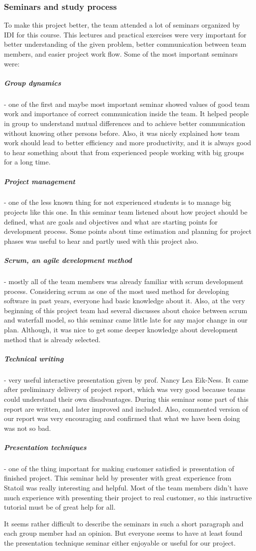 	\subsubsection{Seminars and study process}
	To make this project better,  the team attended a lot of seminars organized by IDI for this course. This lectures and practical exercises were very important for better understanding of the given problem, better communication between team members, and easier project work flow. Some of the most important seminars were:
	
	\subparagraph{Group dynamics} - one of the first and maybe most important seminar showed values of good team work and importance of correct communication inside the team. It helped people in group to understand mutual differences and to achieve better communication without knowing other persons before. Also, it was nicely explained how team work should lead to better efficiency and more productivity, and it is always good to hear something about that from experienced people working with big groups for a long time.
	\subparagraph{Project management} - one of the less known thing for not experienced students is to manage big projects like this one. In this seminar team listened about how project should be defined, what are goals and objectives and what are starting points for development process. Some points about time estimation and planning for project phases was useful to hear and partly used with this project also.
	\subparagraph{Scrum, an agile development method} - mostly all of the team members was already familiar with scrum development process. Considering scrum as one of the most used method for developing software in past years, everyone had basic knowledge about it. Also, at the very beginning of this project team had several discusses about choice between scrum and waterfall model, so this seminar came little late for any major change in our plan. Although, it was nice to get some deeper knowledge about development method that is already selected.
	\subparagraph{Technical writing} - very useful interactive presentation given by prof. Nancy Lea Eik-Ness. It came after preliminary delivery of project report, which was very good because teams could understand their own disadvantages. During this seminar some part of this report are written, and later improved and included. Also, commented version of our report was very encouraging and confirmed that what we have been doing was not so bad.
	\subparagraph{Presentation techniques} - one of the thing important for making customer satisfied is presentation of finished project. This seminar held by presenter with great experience from Statoil was really interesting and helpful. Most of the team members didn't have much experience with presenting their project to real customer, so this instructive tutorial must be of great help for all.

It seems rather difficult to describe the seminars in such a short paragraph and each group member had an opinion. But everyone seems to have at least found the presentation technique seminar either enjoyable or useful for our project.


